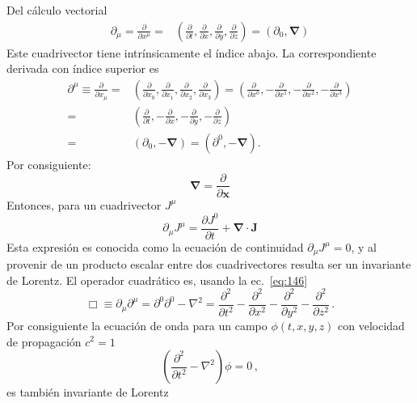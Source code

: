 \begin{frame}
  Del cálculo vectorial
  \begin{align}
      \partial_\mu=\frac{\partial}{\partial x^\mu}=&\left(
    \frac{\partial}{\partial t},\frac{\partial}{\partial x},\frac{\partial}{\partial y},\frac{\partial}{\partial z}
  \right)
  =(\partial_0,\boldsymbol{\nabla})
  \end{align}
Este cuadrivector tiene intrínsicamente el índice abajo. La correspondiente derivada con índice superior es  
\begin{align}
  \partial^\mu\equiv\frac{\partial}{\partial x_\mu}=&
  \left(
    \frac{\partial}{\partial x_0},\frac{\partial}{\partial x_1},\frac{\partial}{\partial x_2},\frac{\partial}{\partial x_3}
  \right)=\left(
    \frac{\partial}{\partial x^0},-\frac{\partial}{\partial x^1},-\frac{\partial}{\partial x^2},-\frac{\partial}{\partial x^3}
  \right)\nonumber\\
  =&\left(
    \frac{\partial}{\partial t},-\frac{\partial}{\partial x},-\frac{\partial}{\partial y},-\frac{\partial}{\partial z}
  \right)\nonumber\\
  =&(\partial_0,-\boldsymbol{\nabla})=(\partial^0,-\boldsymbol{\nabla}).
\end{align}
Por consiguiente:
\begin{equation}
  \label{eq:nabla}
  \boldsymbol{\nabla}=\frac{\partial}{\partial\mathbf{x}}
\end{equation}
Entonces, para un cuadrivector $J^{\mu}$
\begin{equation}
  \label{eq:ecncontiJ}
  \partial_\mu J^\mu=\frac{\partial J^0}{\partial t}+\boldsymbol{\nabla}\cdot\boldsymbol{J}
\end{equation}
Esta expresión es conocida como la ecuaci\'on de continuidad $\partial_\mu J^\mu=0$, y al provenir de un producto escalar entre dos cuadrivectores resulta ser un invariante de Lorentz.
El operador cuadrático es, usando la ec.~\eqref{eq:146}
\begin{equation}
  \label{eq:dalambertian}
  \Box\equiv \partial_\mu\partial^\mu=\partial^0\partial^0-\nabla^2 =\frac{\partial^2}{\partial t^2}-\frac{\partial^2}{\partial x^2}-\frac{\partial^2}{\partial y^2}-\frac{\partial^2}{\partial z^2}\,.
\end{equation}
Por consiguiente la ecuaci\'on de onda para un campo $\phi(t,x,y,z)$  con velocidad de propagación $c^2=1$
\begin{equation}
  \left(
\frac{\partial^2}{\partial t^2}-\nabla^2
  \right)\phi=0\,,
\end{equation}
es también invariante de Lorentz
\end{frame}

